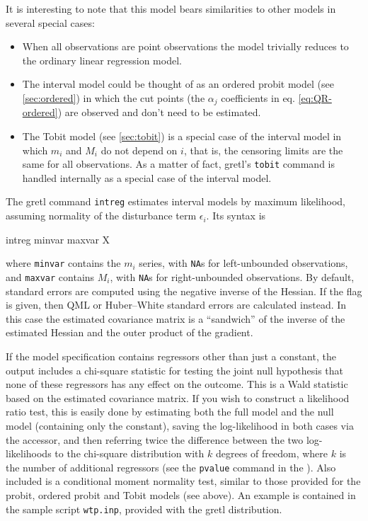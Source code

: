 It is interesting to note that this model bears similarities to other
models in several special cases:
\begin{itemize}
\item When all observations are point observations the model trivially
  reduces to the ordinary linear regression model.
\item The interval model could be thought of as an ordered probit
  model (see \ref{sec:ordered}) in which the cut points (the
  $\alpha_j$ coefficients in eq. \ref{eq:QR-ordered}) are observed and
  don't need to be estimated.
\item The Tobit model (see \ref{sec:tobit}) is a special case of the
  interval model in which $m_i$ and $M_i$ do not depend on $i$, that
  is, the censoring limits are the same for all observations. As a
  matter of fact, gretl's \texttt{tobit} command is handled
  internally as a special case of the interval model.
\end{itemize}

The gretl command \texttt{intreg} estimates interval models by
maximum likelihood, assuming normality of the disturbance term
$\epsilon_i$.  Its syntax is
%
\begin{code}
intreg minvar maxvar X
\end{code}
%
where \texttt{minvar} contains the $m_i$ series, with \texttt{NA}s for
left-unbounded observations, and \texttt{maxvar} contains $M_i$, with
\texttt{NA}s for right-unbounded observations.  By default, standard
errors are computed using the negative inverse of the Hessian.  If the
 flag is given, then QML or Huber--White standard
errors are calculated instead. In this case the estimated covariance
matrix is a ``sandwich'' of the inverse of the estimated Hessian and
the outer product of the gradient.

If the model specification contains regressors other than just a
constant, the output includes a chi-square statistic for testing the
joint null hypothesis that none of these regressors has any effect on
the outcome.  This is a Wald statistic based on the estimated
covariance matrix.  If you wish to construct a likelihood ratio test,
this is easily done by estimating both the full model and the null
model (containing only the constant), saving the log-likelihood in
both cases via the  accessor, and then referring twice the
difference between the two log-likelihoods to the chi-square
distribution with $k$ degrees of freedom, where $k$ is the number of
additional regressors (see the \texttt{pvalue} command in the
\GCR). Also included is a conditional moment normality test, similar
to those provided for the probit, ordered probit and Tobit models (see
above).  An example is contained in the sample script
\texttt{wtp.inp}, provided with the gretl distribution.

